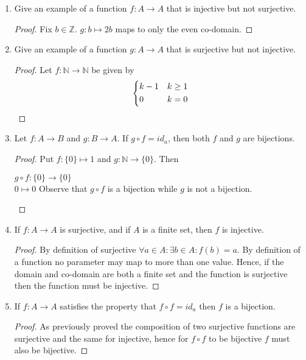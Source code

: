 \documentclass{article}
\begin{document}
\begin{enumerate}
\begin{proof}
    \end{proof}
  \item Give an example of a function $f : A\to A$ that is injective but not surjective.
    \begin{proof}
      Fix $b\in \mathbb{Z}$. $g : b\mapsto 2b$ maps to only the even co-domain.
    \end{proof}
  \item Give an example of a function $g : A\to A$ that is surjective but not injective. 
    \begin{proof}
      Let $f: \mathbb{N} \to \mathbb{N}$ be given by
        $$
        \begin{dcases}
          k-1 & k \geq 1 \\
          0 & k = 0
        \end{dcases}
       $$
     \end{proof}
  \item Let $f : A\to B$ and $g : B\to A$. If $g \circ f = id_{a}$, then both $f$ and $g$ are bijections.
   \begin{proof}
     Put $f : \{0\} \mapsto 1$ and $g: \mathbb{N} \to  \{0\}$. Then
       \begin{center}
         $g \circ f: \{0\} \to \{0\}$ \\
         $0 \mapsto 0$
         Observe that $g \circ f$ is a bijection while $g$ is not a bijection.
       \end{center}
   \end{proof}
  \item If $f : A\to A$ is surjective, and if $A$ is a finite set, then $f$ is injective.
    \begin{proof}
By definition of surjective $\forall a\in A: \exists b\in A: f(b) = a$. By definition of a function no parameter may map to more than one value. Hence, if the domain and co-domain are both a finite set and the function is surjective then the function must be injective.
    \end{proof}
  \item If $f : A\to A$ satisfies the property that $f \circ f = id_{a}$ then $f$ is a bijection.
    \begin{proof}
      As previously proved the composition of two surjective functions are surjective and the same for injective, hence for $f \circ f$ to be bijective $f$ must also be bijective.
    \end{proof}
  \end{enumerate}
\end{document}
